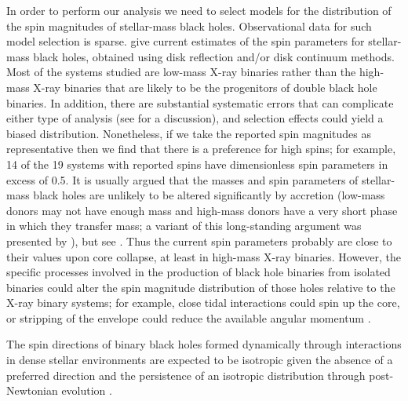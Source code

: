 \documentclass[modern,linenumbers]{aastex61}
\begin{document}
In order to perform our analysis we need to select models for the
distribution of the spin magnitudes of stellar-mass black holes.
Observational data for such model selection is sparse.
\citet{2015PhR...548....1M} give current estimates of the spin
parameters for stellar-mass black holes, obtained using disk
reflection and/or disk continuum methods.  Most of the systems studied
are low-mass X-ray binaries rather than the high-mass X-ray binaries
that are likely to be the progenitors of double black hole binaries.
In addition, there are substantial systematic errors that can
complicate either type of analysis (see \citealt{2015PhR...548....1M}
for a discussion), and selection effects could yield a biased
distribution. Nonetheless, if we take the reported spin magnitudes as
representative then we find that there is a preference for high spins;
for example, 14 of the 19 systems with reported spins have
dimensionless spin parameters in excess of 0.5.  It is usually argued
that the masses and spin parameters of stellar-mass black holes are
unlikely to be altered significantly by accretion (low-mass donors may
not have enough mass and high-mass donors have a very short phase in
which they transfer mass; a variant of this long-standing argument was
presented by \citet{1999MNRAS.305..654K}), but see
\citet{2003MNRAS.341..385P,2015ApJ...800...17F}.  Thus the current
spin parameters probably are close to their values upon core collapse,
at least in high-mass X-ray binaries.  However, the specific processes
involved in the production of black hole binaries from isolated
binaries could alter the spin magnitude distribution of those holes
relative to the X-ray binary systems; for example, close tidal
interactions could spin up the core, or stripping of the envelope
could reduce the available angular momentum
\citep{2016MNRAS.462..844K,2017arXiv170200885Z,2017arXiv170203952H}.

The spin directions of binary black holes formed dynamically through
interactions in dense stellar environments
\citep{SigurdssonHernquist:1993,1993Natur.364..421K,PZMcMillan:2000,Rodriguez:2015,Stone:2016}
are expected to be isotropic given the absence of a preferred
direction \citep[e.g.,][]{2016ApJ...832L...2R} and the persistence of
an isotropic distribution through post-Newtonian evolution
\citep{2004PhRvD..70l4020S,2007ApJ...661L.147B}.  
\end{document}
